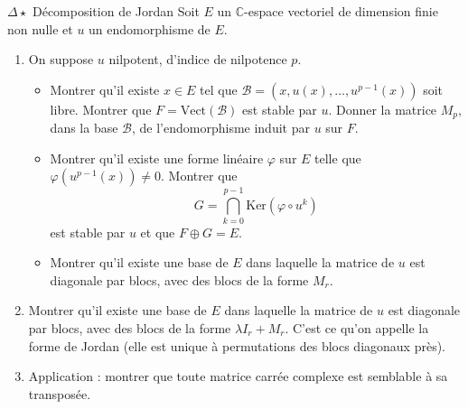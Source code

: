 \documentclass[french,a4paper]{article}
\newcommand{\C}{\mathbb{C}}
\renewcommand{\ker}{\text{Ker}}
\theoremstyle{plain}
\theoremstyle{definition}
\theoremstyle{remark}
\begin{document}
\begin{ex}{$\Delta\star$ Décomposition de Jordan}
	Soit $E$ un $\C$-espace vectoriel de dimension finie non nulle et $u$ un endomorphisme de $E$.
	\begin{enumerate}
		\item On suppose $u$ nilpotent, d'indice de nilpotence $p$.
		\begin{itemize}
			\item Montrer qu'il existe $x\in E$ tel que $\mathcal{B}=(x,u(x),\ldots,u^{p-1}(x))$ soit libre. Montrer que $F=\text{Vect}(\mathcal{B})$ est stable par $u$. Donner la matrice $M_p$, dans la base $\mathcal{B}$, de l'endomorphisme induit par $u$ sur $F$.
			\item Montrer qu'il existe une forme linéaire $\varphi$ sur $E$ telle que $\varphi(u^{p-1}(x))\ne 0$. Montrer que $$G=\bigcap_{k=0}^{p-1}\ker(\varphi\circ u^{k})$$ est stable par $u$ et que $F\oplus G=E$.
			\item Montrer qu'il existe une base de $E$ dans laquelle la matrice de $u$ est diagonale par blocs, avec des blocs de la forme $M_r$.
		\end{itemize}
		\item Montrer qu'il existe une base de $E$ dans laquelle la matrice de $u$ est diagonale par blocs, avec des blocs de la forme $\lambda I_r+M_r$. C'est ce qu'on appelle la forme de Jordan (elle est unique à permutations des blocs diagonaux près).
		\item Application : montrer que toute matrice carrée complexe est semblable à sa transposée.
	\end{enumerate}
\end{ex}
\end{document}

